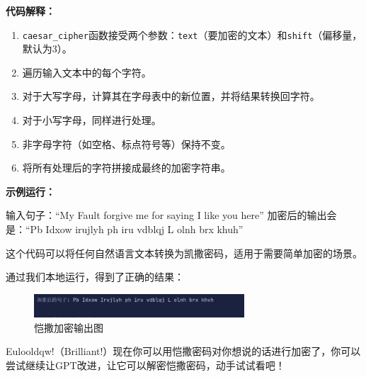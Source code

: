 \textbf{代码解释：}

\begin{enumerate}
\def\labelenumi{\arabic{enumi}.}

\item
  \texttt{caesar\_cipher}函数接受两个参数：\texttt{text}（要加密的文本）和\texttt{shift}（偏移量，默认为3）。
\item
  遍历输入文本中的每个字符。
\item
  对于大写字母，计算其在字母表中的新位置，并将结果转换回字符。
\item
  对于小写字母，同样进行处理。
\item
  非字母字符（如空格、标点符号等）保持不变。
\item
  将所有处理后的字符拼接成最终的加密字符串。
\end{enumerate}

\textbf{示例运行：}

输入句子：``My Fault forgive me for saying I like you here''
加密后的输出会是：``Pb Idxow irujlyh ph iru vdblqj L olnh brx khuh''

这个代码可以将任何自然语言文本转换为凯撒密码，适用于需要简单加密的场景。

通过我们本地运行，得到了正确的结果：

\centering
\begin{figure}[H] %
    \centering %
    \includegraphics[width=0.7\textwidth]{sections/images/image-20250210173814654.png} %
    \caption{恺撒加密输出图} %
    \label{Fig.main1} %
\end{figure}%

Eulooldqw!（Brilliant!）现在你可以用恺撒密码对你想说的话进行加密了，你可以尝试继续让GPT改进，让它可以解密恺撒密码，动手试试看吧！